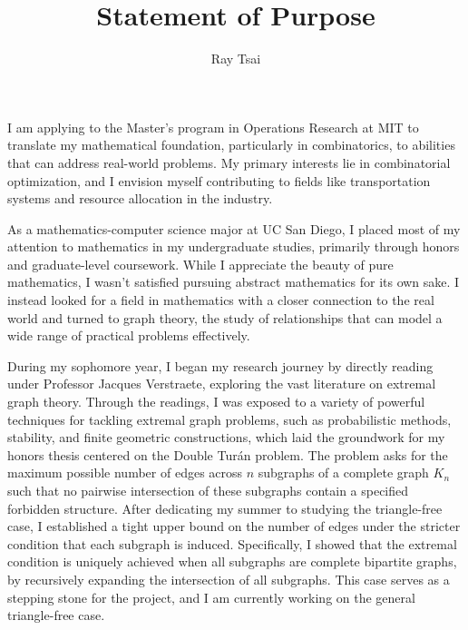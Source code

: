 \documentclass[12pt]{article}
\title{Statement of Purpose}
\author{Ray Tsai}
\date{}
\begin{document}
\maketitle

\vspace{-0.25in}

I am applying to the Master's program in Operations Research at MIT to translate my mathematical
foundation, particularly in combinatorics, to abilities that can address real-world problems. My
primary interests lie in combinatorial optimization, and I envision myself contributing to fields
like transportation systems and resource allocation in the industry.

As a mathematics-computer science major at UC San Diego, I placed most of my attention to
mathematics in my undergraduate studies, primarily through honors and graduate-level coursework.
While I appreciate the beauty of pure mathematics, I wasn't satisfied pursuing abstract mathematics
for its own sake. I instead looked for a field in mathematics with a closer connection to the real
world and turned to graph theory, the study of relationships that can model a wide range of
practical problems effectively.

During my sophomore year, I began my research journey by directly reading under Professor Jacques
Verstraete, exploring the vast literature on extremal graph theory. Through the readings, I was
exposed to a variety of powerful techniques for tackling extremal graph problems, such as
probabilistic methods, stability, and finite geometric constructions, which laid the groundwork for
my honors thesis centered on the Double Turán problem. The problem asks for the maximum possible
number of edges across $n$ subgraphs of a complete graph $K_n$ such that no pairwise intersection of
these subgraphs contain a specified forbidden structure. After dedicating my summer to studying the
triangle-free case, I established a tight upper bound on the number of edges under the stricter
condition that each subgraph is induced. Specifically, I showed that the extremal condition is
uniquely achieved when all subgraphs are complete bipartite graphs, by recursively expanding the
intersection of all subgraphs. This case serves as a stepping stone for the project, and I am
currently working on the general triangle-free case. 
\end{document}
